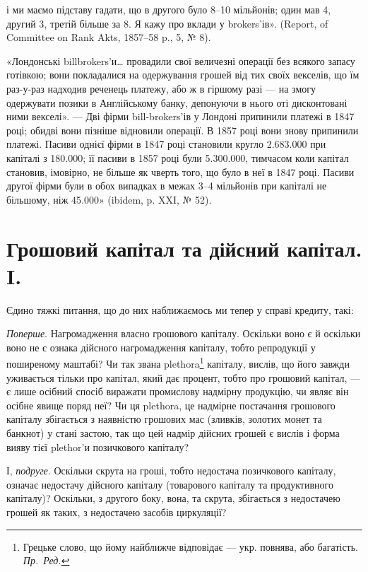 \parcont{}  %
і ми маємо підставу гадати, що в другого було 8--10 мільйонів; один мав 4,
другий 3, третій більше за 8. Я кажу про вклади у brokers’ів». (Report,
of Committee on Rank Akts, 1857--58 p., 5, № 8).

«Лондонські billbrokers’и\dots{} провадили свої величезні операції без всякого
запасу готівкою; вони покладалися на одержування грошей від тих своїх векселів,
що їм раз-у-раз надходив реченець платежу, або ж в гіршому разі — на змогу
одержувати позики в Англійському банку, депонуючи в нього оті дисконтовані
ними векселі». — Дві фірми bill-brokers’ів у Лондоні припинили платежі в
1847 році; обидві вони пізніше відновили операції. В 1857 році вони знову
припинили платежі. Пасиви однієї фірми в 1847 році становили кругло
\num{2.683.000} при капіталі з \num{180.000}; її пасиви в 1857 році були \deq{}
\num{5.300.000}, тимчасом коли капітал становив, імовірно, не більше як чверть
того, що було в неї в 1847 році. Пасиви другої фірми були в обох випадках
в межах 3--4 мільйонів при капіталі не більшому, ніж \num{45.000}» (ibidem,
p. XXI, № 52).

\section{Грошовий капітал та дійсний капітал. I.}

Єдино тяжкі питання, що до них наближаємось ми тепер у справі кредиту,
такі:

\emph{Поперше}. Нагромадження власно грошового капіталу. Оскільки воно
є й оскільки воно не є ознака дійсного нагромадження капіталу, тобто репродукції
у поширеному маштабі? Чи так звана plethora\footnote*{
Грецьке слово, що йому найближче відповідає — укр. повнява, або багатість. \emph{Пр.~Ред.}
} капіталу, вислів, що його
завжди уживається тільки про капітал, який дає процент, тобто про грошовий
капітал, — є лише осібний спосіб виражати промислову надмірну продукцію,
чи являє він осібне явище поряд неї? Чи ця plethora, це надмірне постачання
грошового капіталу збігається з наявністю грошових мас (зливків,
золотих монет та банкнот) у стані застою, так що цей надмір дійсних грошей
є вислів і форма вияву тієї plethor’и позичкового капіталу?

І, \emph{подруге}. Оскільки скрута на гроші, тобто недостача позичкового капіталу,
означає недостачу дійсного капіталу (товарового капіталу та продуктивного
капіталу)? Оскільки, з другого боку, вона, та скрута, збігається з недостачею
грошей як таких, з недостачею засобів циркуляції?

